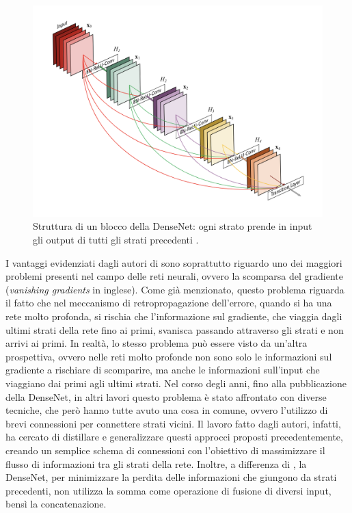 \begin{figure}[h!]
  \hspace*{0.6in}
  \includegraphics[scale=0.5]{img/densenet.png}
  \caption{Struttura di un blocco della DenseNet: ogni strato prende in input gli output di tutti gli strati precedenti \cite{densenet}.}
  \label{fig:densenet}
\end{figure}


I vantaggi evidenziati dagli autori di \cite{densenet} sono soprattutto riguardo uno dei maggiori problemi presenti nel campo delle reti neurali, ovvero la scomparsa del gradiente (\textit{vanishing gradients} in inglese). Come già menzionato, questo problema riguarda il fatto che nel meccanismo di retropropagazione dell'errore, quando si ha una rete molto profonda, si rischia che l'informazione sul gradiente, che viaggia dagli ultimi strati della rete fino ai primi, svanisca passando attraverso gli strati e non arrivi ai primi. In realtà, lo stesso problema può essere visto da un'altra prospettiva, ovvero nelle reti molto profonde non sono solo le informazioni sul gradiente a rischiare di scomparire, ma anche le informazioni sull'input che viaggiano dai primi agli ultimi strati. Nel corso degli anni, fino alla pubblicazione della DenseNet, in altri lavori \cite{resnets, huang2016deep, srivastava2015training, larsson2016fractalnet} questo problema è stato affrontato con diverse tecniche, che però hanno tutte avuto una cosa in comune, ovvero l'utilizzo di brevi connessioni per connettere strati vicini. Il lavoro fatto dagli autori, infatti, ha cercato di distillare e generalizzare questi approcci proposti precedentemente, creando un semplice schema di connessioni con l'obiettivo di massimizzare il flusso di informazioni tra gli strati della rete. Inoltre, a differenza di \cite{resnets}, la DenseNet, per minimizzare la perdita delle informazioni che giungono da strati precedenti, non utilizza la somma come operazione di fusione di diversi input, bensì la concatenazione.







